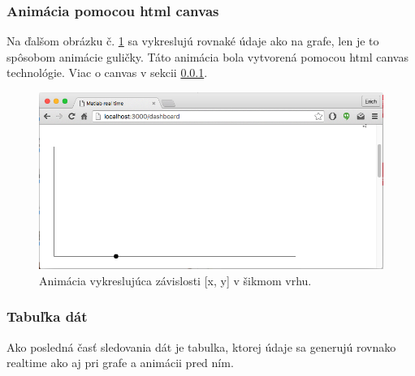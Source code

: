 \subsubsection{Animácia pomocou html canvas}\label{section-canvas}

Na ďalšom obrázku č. \ref{img-angular-canvas} sa vykreslujú rovnaké údaje ako na grafe, len je to spôsobom animácie guličky. Táto animácia bola vytvorená pomocou html canvas technológie. Viac o canvas v sekcii \ref{section-canvas}.

\begin{figure}[H]
  \centering
  \includegraphics[scale=0.5]{img/code/angular-canvas.png}
  \caption{Animácia vykreslujúca závislosti [x, y] v šikmom vrhu.}
  \label{img-angular-canvas}
\end{figure}

\subsubsection{Tabuľka dát}

Ako posledná časť sledovania dát je tabulka, ktorej údaje sa generujú rovnako realtime ako aj pri grafe a animácii pred ním.

